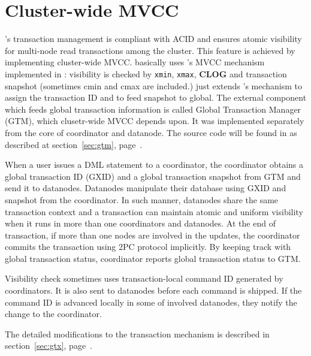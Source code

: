 %
%
%



\section{\label{sec:cw-mvcc}Cluster-wide MVCC}

  \XC's transaction management is compliant with ACID and ensures atomic visibility for
  multi-node read transactions among the cluster.
  This feature is achieved by implementing cluster-wide MVCC.
  \XC{} basically uses \PG's MVCC mechanism implemented in :
  visibility is checked by \texttt{xmin}, \texttt{xmax}, \textbf{CLOG} and transaction snapshot
  (sometimes cmin and cmax are included.)
  \XC{} just extends \PG's mechanism to assign the transaction ID and to feed snapshot to global.
  The external component which feeds global transaction information is called Global Transaction
  Manager (GTM), which clusetr-wide MVCC depends upon.
  It was implemented separately from the core of coordinator and datanode.
  The source code will be found in
   as described at section~\ref{sec:gtm}, page~\pageref{sec:gtm}.
  
  When a user issues a DML statement to a coordinator, the coordinator obtains a global transaction
  ID (GXID) and a global transaction snapshot from GTM and send it to datanodes.
  Datanodes manipulate their database using GXID and snapshot from the coordinator.
  In such manner, datanodes share the same transaction context and a transaction
  can maintain atomic and uniform visibility
  when it runs in more than one coordinators and datanodes.
  At the end of transaction, if more than one nodes are involved in the updates, the coordinator commits
  the transaction using 2PC protocol implicitly.
  By keeping track with global transaction status, coordinator reports global transaction status to GTM.
  
  Visibility check sometimes uses transaction-local command ID generated by coordinators.
  It is also sent to datanodes before each command is shipped.
  If the command ID is advanced locally in some of involved datanodes,
  they notify the change to the coordinator. 
  
  The detailed modifications to the transaction mechanism is described in section~\ref{sec:gtx}, page~\pageref{sec:gtx}.
  

